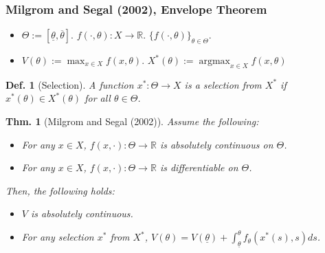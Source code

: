 \documentclass[11pt,a4paper,dvipdfmx]{article}
\theoremstyle{plain}
\newtheorem{thm}{Thm.}[section]
\newtheorem{df}{Def.}[section]
\newcommand{\R}{\mathbb{R}}
\renewcommand{\bar}{\overline}
\newcommand{\1}{\mathbbm{1}}
\DeclareMathOperator*{\argmax}{argmax}
\begin{document}
\subsubsection{Milgrom and Segal (2002), Envelope Theorem}
\begin{itemize}
	\item $\Theta := [\underline{\theta}, \bar{\theta}]$. $f(\cdot, \theta): X \to \R$. $\{f(\cdot, \theta)\}_{\theta \in \Theta}$.
	\item $V(\theta) := \max_{x \in X} f(x, \theta)$. $X^*(\theta) := \argmax_{x \in X} f(x, \theta)$
\end{itemize}
\begin{df}[Selection]
	A function $x^*: \Theta \to X$ is a selection from $X^*$ if $x^*(\theta) \in X^*(\theta)$ for all $\theta \in \Theta$.
\end{df}
\begin{thm}[Milgrom and Segal (2002)]
	Assume the following:
	\begin{itemize}
		\item For any $x \in X$, $f(x, \cdot): \Theta \to \R$ is absolutely continuous on $\Theta$.
		\item For any $x \in X$, $f(x, \cdot): \Theta \to \R$ is differentiable on $\Theta$.
	\end{itemize}
	Then, the following holds:
	\begin{itemize}
		\item $V$ is absolutely continuous.
		\item For any selection $x^*$ from $X^*$, $V(\theta) = V(\underline{\theta}) + \int_{\underline{\theta}}^\theta f_\theta(x^*(s), s) ds$.
	\end{itemize}
\end{thm}
\end{document}
